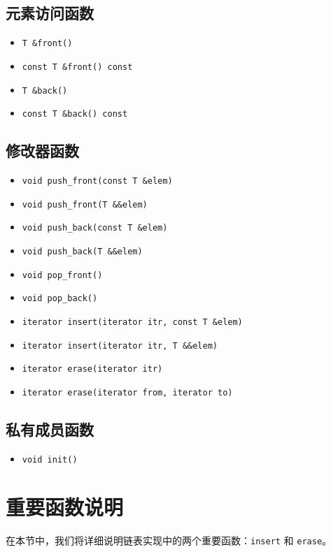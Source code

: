 \documentclass[UTF8]{ctexart}
\begin{document}
\subsection{元素访问函数}
\begin{itemize}
  \item \texttt{T \&front()}
  \item \texttt{const T \&front() const}
  \item \texttt{T \&back()}
  \item \texttt{const T \&back() const}
\end{itemize}

\subsection{修改器函数}
\begin{itemize}
  \item \texttt{void push\_front(const T \&elem)}
  \item \texttt{void push\_front(T \&\&elem)}
  \item \texttt{void push\_back(const T \&elem)}
  \item \texttt{void push\_back(T \&\&elem)}
  \item \texttt{void pop\_front()}
  \item \texttt{void pop\_back()}
  \item \texttt{iterator insert(iterator itr, const T \&elem)}
  \item \texttt{iterator insert(iterator itr, T \&\&elem)}
  \item \texttt{iterator erase(iterator itr)}
  \item \texttt{iterator erase(iterator from, iterator to)}
\end{itemize}

\subsection{私有成员函数}
\begin{itemize}
  \item \texttt{void init()}
\end{itemize}

\section{重要函数说明}

在本节中，我们将详细说明链表实现中的两个重要函数：\texttt{insert} 和 \texttt{erase}。
\end{document}
